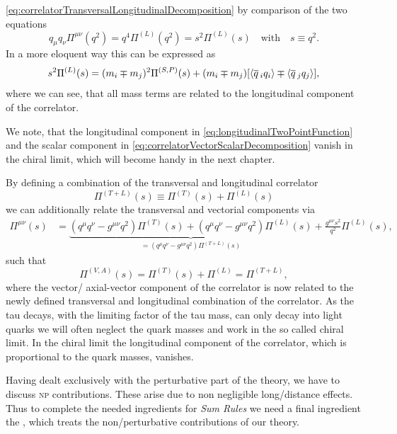 \documentclass[../../index.tex]{subfiles}
\begin{document}
\cref{eq:correlatorTransversalLongitudinalDecomposition} by comparison of the
two equations
\begin{equation}
  q_\mu q_\nu \Pi^{\mu\nu}(q^2) = q^4 \Pi^{(L)}(q^2) = s^2 \Pi^{(L)}(s) \quad \text{with} \quad s\equiv q^2.
\end{equation}
In a more eloquent way this can be expressed as
\begin{equation}
  \label{eq:longitudinalTwoPointFunction}
  s^2 \Pi^{(L)}(s) = (m_i \mp m_j)^2 \Pi^{(S,P)}(s) + (m_i \mp m_j)[ \langle \overline{q}\,_i q_i \rangle \mp \langle \overline{q}\,_j q_j \rangle],
\end{equation}
where we can see, that all mass terms are related to the longitudinal component
of the correlator.

We note, that the longitudinal component in
\cref{eq:longitudinalTwoPointFunction} and the scalar component in
\cref{eq:correlatorVectorScalarDecomposition} vanish in the chiral limit, which
will become handy in the next chapter.

By defining a combination of the transversal and longitudinal correlator
\begin{equation}
  \label{eq:correlatorCombination}
  \Pi^{(T+L)}(s) \equiv \Pi^{(T)}(s) + \Pi^{(L)}(s)
\end{equation}
we can additionally relate the transversal and vectorial components via
\begin{equation}
  \label{eq:longitudinalCorrelator}
  \begin{split}
    \Pi^{\mu\nu}(s) &= \underbrace{(q^\mu q^\nu - g^{\mu\nu}q^2)\Pi^{(T)}(s) +
      (q^\mu q^\nu - g^{\mu\nu} q^2)\Pi^{(L)}(s)}_{=(q^\mu q^\nu - g^{\mu\nu}
      q^2) \Pi^{(T+L)}(s)} + \frac{g^{\mu\nu}s^2}{q^2}\Pi^{(L)}(s),
  \end{split}
\end{equation}
such that
\begin{equation}
  \Pi^{(V,A)}(s) = \Pi^{(T)}(s) + \Pi^{(L)} = \Pi^{(T+L)},
\end{equation}
where the vector/ axial-vector component of the correlator is now related to the
newly defined transversal and longitudinal combination of the correlator. As the
tau decays, with the limiting factor of the tau mass, can only decay into light
quarks we will often neglect the quark masses and work in the so called chiral
limit. In the chiral limit the longitudinal component of the correlator, which
is proportional to the quark masses, vanishes.

Having dealt exclusively with the perturbative part of the theory, we have to
discuss \textsc{np} contributions. These arise due to non negligible
long\-/distance effects. Thus to complete the needed ingredients for \textit{Sum
  Rules} we need a final ingredient the , which treats the non\-/perturbative contributions of our theory.
\end{document}
